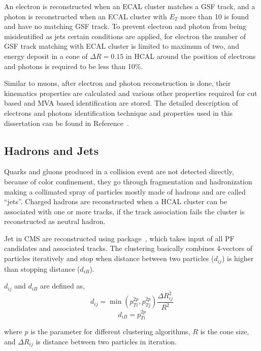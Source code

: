 An electron is reconstructed when an \gls{ECAL} cluster matches a \gls{GSF} track,
and a photon is reconstructed when an \gls{ECAL} cluster with \( E_T \)
more than 10\GeV{} is found and have no matching \gls{GSF} track. To prevent
electron and photon from being misidentified as jets certain conditions are applied,
for electron the number of \gls{GSF} track matching with \gls{ECAL} cluster is limited to
maximum of two, and energy deposit in a cone of \( \Delta R = 0.15 \) in \gls{HCAL}
around the position of electrons and photons is required to be less than 10\%.

Similar to muons, after electron and photon reconstruction is done, their kinematics properties
are calculated and various other properties required for cut based
and \gls{MVA} based identification are stored. The detailed description of electrons
and photons identification technique and properties used in this dissertation
can be found in Reference~\cite{cms-egamma-id}.

\subsection{
  Hadrons and Jets
}

Quarks and gluons produced in a collision event are not detected directly,
because of color confinement, they go through fragmentation and
hadronization making a collimated spray of particles mostly made of hadrons
and are called ``jets''. Charged hadrons are reconstructed when a \gls{HCAL} cluster can be associated with
one or more tracks, if the track association fails the cluster is reconstructed as
neutral hadron.

Jet in \gls{CMS} are reconstructed using \FASTJET{} package~\cite{fastjet-manual},
which takes input of all \gls{PF} candidates and associated tracks. The clustering
basically combines 4-vectors of particles iteratively and stop when distance between
two particles (\( d_{ij} \)) is higher than stopping distance (\( d_{iB} \)).

\( d_{ij} \) and \( d_{iB} \) are defined as,
\begin{equation}
  d_{ij} = \min (p_{Ti}^{2p}, p_{Tj}^{2p}) \frac{\Delta R_{ij}^{2}}{R^{2}}
\end{equation}
\begin{equation}
  d_{iB} = p_{Ti}^{2p}
\end{equation}

where \( p \) is the parameter for different clustering algorithms, \( R \) is the
cone size, and
\( \Delta R_{ij} \) is distance between two particles in iteration.

